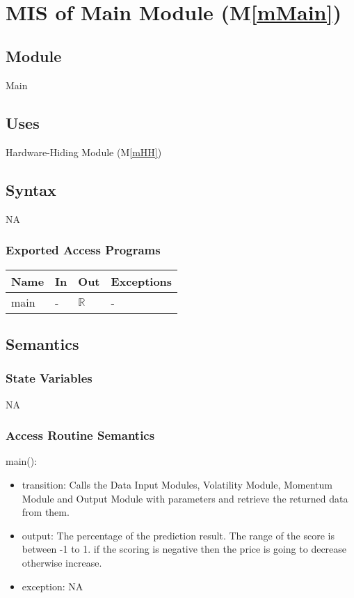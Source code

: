 \documentclass[12pt, titlepage]{article}
\newcommand{\mref}[1]{M\ref{#1}}
\begin{document}
\newpage
~\newpage

\section{MIS of Main Module (\mref{mMain}) } 

\subsection{Module}
Main
\subsection{Uses}
Hardware-Hiding Module (\mref{mHH})

\subsection{Syntax}
NA
\subsubsection{Exported Access Programs}

\begin{center}
\begin{tabular}{p{2cm} p{4cm} p{4cm} p{2cm}}
\hline
\textbf{Name} & \textbf{In} & \textbf{Out} & \textbf{Exceptions} \\
\hline

main & - &$\mathbb{R}$ & - \\
\hline
\end{tabular}
\end{center}

\subsection{Semantics}
\subsubsection{State Variables}
NA
\subsubsection{Access Routine Semantics}

\noindent main():
\begin{itemize}
\item transition: Calls the Data Input Modules, Volatility Module, Momentum Module and Output Module with parameters and retrieve the returned data from them. 
\item output: The percentage of the prediction result. The range of the score is between -1 to 1. if the scoring is negative then the price is going to decrease otherwise increase. \\
\item exception: NA
\end{itemize}
\end{document}
